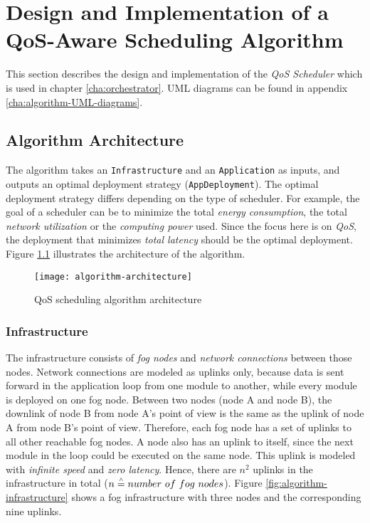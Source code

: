 \chapter{Design and Implementation of a QoS-Aware Scheduling Algorithm\label{cha:algorithm}}

This section describes the design and implementation of the \textit{QoS Scheduler} which is used in chapter \ref{cha:orchestrator}. UML diagrams can be found in appendix \ref{cha:algorithm-UML-diagrams}.

\section{Algorithm Architecture}

The algorithm takes an \texttt{Infrastructure} and an \texttt{Application} as inputs, and outputs an optimal deployment strategy (\texttt{AppDeployment}).
The optimal deployment strategy differs depending on the type of scheduler.
For example, the goal of a scheduler can be to minimize the total \textit{energy consumption}, the total \textit{network utilization} or the \textit{computing power} used.
Since the focus here is on \textit{QoS}, the deployment that minimizes \textit{total latency} should be the optimal deployment.
Figure \ref{fig:algorithm-architecture} illustrates the architecture of the algorithm.

\begin{figure}[h]
    \centering
    \texttt{[image: algorithm-architecture]}
    \caption{QoS scheduling algorithm architecture}
    \label{fig:algorithm-architecture}
\end{figure}


\subsection{Infrastructure\label{sec:algorithm-infrastructure}}

The infrastructure consists of \textit{fog nodes} and \textit{network connections} between those nodes.
Network connections are modeled as uplinks only, because data is sent forward in the application loop from one module to another, while every module is deployed on one fog node.
Between two nodes (node A and node B), the downlink of node B from node A's point of view is the same as the uplink of node A from node B's point of view.
Therefore, each fog node has a set of uplinks to all other reachable fog nodes.
A node also has an uplink to itself, since the next module in the loop could be executed on the same node.
This uplink is modeled with \textit{infinite speed} and \textit{zero latency}.
Hence, there are \(n^2\) uplinks in the infrastructure in total ($n \overset{\scriptscriptstyle\wedge}{=} number\ of\ fog\ nodes$).
Figure \ref{fig:algorithm-infrastructure} shows a fog infrastructure with three nodes and the corresponding nine uplinks.


